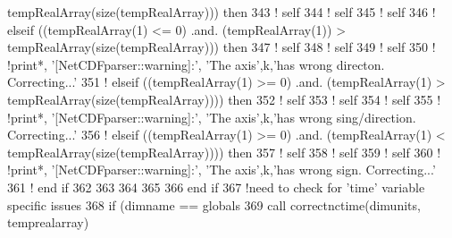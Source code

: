 \begin{DoxyCode}
{       tempRealArray(size(tempRealArray))) then}
343                             \textcolor{comment}{!     self%
344                             \textcolor{comment}{!     self%
345                             \textcolor{comment}{!     self%
346                             \textcolor{comment}{! elseif ((tempRealArray(1) <= 0) .and. (tempRealArray(1)) >
       tempRealArray(size(tempRealArray))) then}
347                             \textcolor{comment}{!     self%
348                             \textcolor{comment}{!     self%
349                             \textcolor{comment}{!     self%
350                             \textcolor{comment}{!     !print*, '[NetCDFparser::warning]:', 'The axis',k,'has wrong directon.
       Correcting...'}
351                             \textcolor{comment}{! elseif ((tempRealArray(1) >= 0) .and. (tempRealArray(1) >
       tempRealArray(size(tempRealArray)))) then}
352                             \textcolor{comment}{!     self%
353                             \textcolor{comment}{!     self%
354                             \textcolor{comment}{!     self%
355                             \textcolor{comment}{!     !print*, '[NetCDFparser::warning]:', 'The axis',k,'has wrong
       sing/direction. Correcting...'}
356                             \textcolor{comment}{! elseif ((tempRealArray(1) >= 0) .and. (tempRealArray(1) <
       tempRealArray(size(tempRealArray)))) then}
357                             \textcolor{comment}{!     self%
358                             \textcolor{comment}{!     self%
359                             \textcolor{comment}{!     self%
360                             \textcolor{comment}{!     !print*, '[NetCDFparser::warning]:', 'The axis',k,'has wrong sign.
       Correcting...'}
361                             \textcolor{comment}{! end if}
362 
363 
364 
365 
366 \textcolor{keywordflow}{                        end if}
367                         \textcolor{comment}{!need to check for 'time' variable specific issues}
368                         \textcolor{keywordflow}{if} (dimname == globals%
369                             \textcolor{keyword}{call }correctnctime(dimunits, temprealarray)
}}}}}}}}}}}}
\end{DoxyCode}

